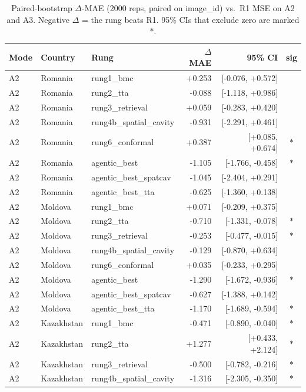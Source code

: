 \begin{table}[t]
\centering\small
\caption{Paired-bootstrap $\Delta$-MAE (2000 reps, paired on image\_id) vs.\ R1 MSE on A2 and A3. Negative $\Delta$ = the rung beats R1. 95\% CIs that exclude zero are marked $\ast$.}
\label{tab:bootstrap}
\setlength{\tabcolsep}{4pt}
\begin{tabular}{l l l r r c}
\toprule
Mode & Country & Rung & $\Delta$MAE & 95\% CI & sig \\
\midrule
A2 & Romania & rung1\_bmc & +0.253 & [-0.076, +0.572] &  \\
A2 & Romania & rung2\_tta & -0.088 & [-1.118, +0.986] &  \\
A2 & Romania & rung3\_retrieval & +0.059 & [-0.283, +0.420] &  \\
A2 & Romania & rung4b\_spatial\_cavity & -0.931 & [-2.291, +0.461] &  \\
A2 & Romania & rung6\_conformal & +0.387 & [+0.085, +0.674] & $\ast$ \\
A2 & Romania & agentic\_best & -1.105 & [-1.766, -0.458] & $\ast$ \\
A2 & Romania & agentic\_best\_spatcav & -1.045 & [-2.404, +0.291] &  \\
A2 & Romania & agentic\_best\_tta & -0.625 & [-1.360, +0.138] &  \\
A2 & Moldova & rung1\_bmc & +0.071 & [-0.209, +0.375] &  \\
A2 & Moldova & rung2\_tta & -0.710 & [-1.331, -0.078] & $\ast$ \\
A2 & Moldova & rung3\_retrieval & -0.253 & [-0.477, -0.015] & $\ast$ \\
A2 & Moldova & rung4b\_spatial\_cavity & -0.129 & [-0.870, +0.634] &  \\
A2 & Moldova & rung6\_conformal & +0.035 & [-0.233, +0.295] &  \\
A2 & Moldova & agentic\_best & -1.290 & [-1.672, -0.936] & $\ast$ \\
A2 & Moldova & agentic\_best\_spatcav & -0.627 & [-1.388, +0.142] &  \\
A2 & Moldova & agentic\_best\_tta & -1.170 & [-1.689, -0.594] & $\ast$ \\
A2 & Kazakhstan & rung1\_bmc & -0.471 & [-0.890, -0.040] & $\ast$ \\
A2 & Kazakhstan & rung2\_tta & +1.277 & [+0.433, +2.124] & $\ast$ \\
A2 & Kazakhstan & rung3\_retrieval & -0.500 & [-0.782, -0.216] & $\ast$ \\
A2 & Kazakhstan & rung4b\_spatial\_cavity & -1.316 & [-2.305, -0.350] & $\ast$ \\

\end{tabular}
\end{table}
